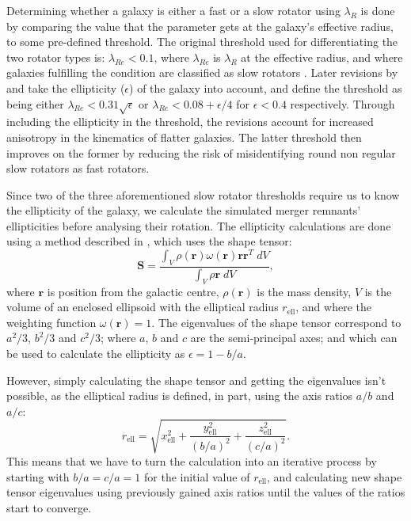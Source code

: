 \documentclass[english, oneside]{HYgradu}
\begin{document}
Determining whether a galaxy is either a fast or a slow rotator using $\lambda_R$ is done by comparing the value that the parameter gets at the galaxy's effective radius, to some pre-defined threshold. The original threshold used for differentiating the two rotator types is: $\lambda_{Re} < 0.1$, where $\lambda_{Re}$ is $\lambda_R$ at the effective radius, and where galaxies fulfilling the condition are classified as slow rotators \citep{Emsellem2007}. Later revisions by \cite{Emsellem2011} and \cite{Cappellari2016} take the ellipticity ($\epsilon$) of the galaxy into account, and define the threshold as being either $\lambda_{Re} < 0.31\sqrt{\epsilon}$ or $\lambda_{Re} < 0.08 + \epsilon/4$ for $\epsilon < 0.4$ respectively. Through including the ellipticity in the threshold, the revisions account for increased anisotropy in the kinematics of flatter galaxies. The latter threshold then improves on the former by reducing the risk of misidentifying round non regular slow rotators as fast rotators.

Since two of the three aforementioned slow rotator thresholds require us to know the ellipticity of the galaxy, we calculate the simulated merger remnants' ellipticities before analysing their rotation. The ellipticity calculations are done using a method described in \cite{Zemp2011}, which uses the shape tensor:
\begin{equation}
\mathbf{S} = \frac{\int_V \rho(\mathbf{r}) \omega(\mathbf{r}) \mathbf{r} \mathbf{r}^T \; dV }{\int_V \rho{\mathbf{r}} \; dV},
\end{equation}
where $\mathbf{r}$ is position from the galactic centre, $\rho(\mathbf{r})$ is the mass density, $V$ is the volume of an enclosed ellipsoid with the elliptical radius $r_\mathrm{ell}$, and where the weighting function $\omega(\mathbf{r}) = 1$. The eigenvalues of the shape tensor correspond to $a^2/3$, $b^2/3$ and $c^2/3$; where $a$, $b$ and $c$ are the semi-principal axes; and which can be used to calculate the ellipticity as $\epsilon = 1 - b/a$. 

However, simply calculating the shape tensor and getting the eigenvalues isn't possible, as the elliptical radius is defined, in part, using the axis ratios $a/b$ and $a/c$:
\begin{equation}
r_\mathrm{ell} = \sqrt{x_\mathrm{ell}^2 + \frac{y_\mathrm{ell}^2}{(b/a)^2} + \frac{z_\mathrm{ell}^2}{(c/a)^2}}.
\end{equation}
This means that we have to turn the calculation into an iterative process by starting with $b/a = c/a = 1$ for the initial value of $r_\mathrm{ell}$, and calculating new shape tensor eigenvalues using previously gained axis ratios until the values of the ratios start to converge. 
\end{document}
